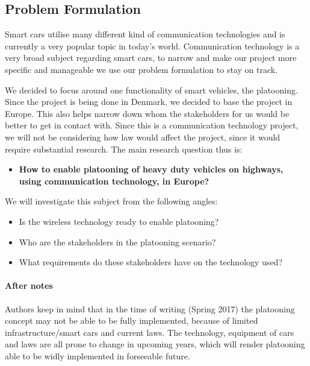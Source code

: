\subsection{Problem Formulation}

Smart cars utilise many different kind of communication technologies and is currently a very popular topic in today's world. Communication technology is a very broad subject regarding smart cars, to narrow and make our project more specific and manageable we use our problem formulation to stay on track.\par
We decided to focus around one functionality of smart vehicles, the platooning. Since the project is being done in Denmark, we decided to base the project in Europe. This also helps narrow down whom the stakeholders for us would be better to get in contact with.
Since this is a communication technology project, we will not be considering how law would affect the project, since it would require substantial research. The main research question thus is:
% 
\begin{itemize}
    \item \textbf{How to enable platooning of heavy duty vehicles on highways, using communication technology, in Europe?}
\end{itemize}
% 
We will investigate this subject from the following angles:
\begin{itemize}[nolistsep,noitemsep]
    \item Is the wireless technology ready to enable platooning?
    \item Who are the stakeholders in the platooning scenario?
    \item What requirements do these stakeholders have on the technology used?
\end{itemize}
% 
\paragraph{After notes}\par
Authors keep in mind that in the time of writing (Spring 2017) the platooning concept may not be able to be fully implemented, because of limited infrastructure/smart cars and current laws. The technology, equipment of cars and laws are all prone to change in upcoming years, which will render platooning able to be widly implemented in forseeable future.